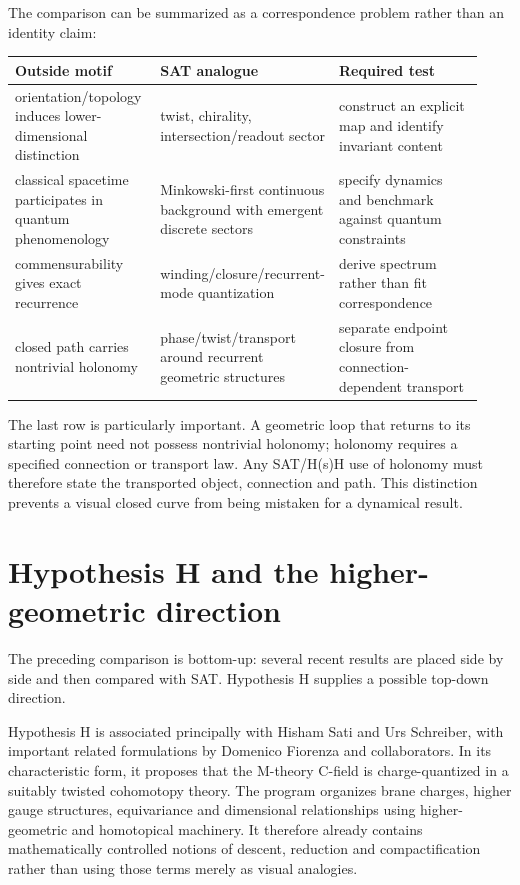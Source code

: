 \documentclass[11pt]{article}
\begin{document}
The comparison can be summarized as a correspondence problem rather than an identity claim:
\begin{center}
\begin{tabular}{p{0.31\linewidth}p{0.31\linewidth}p{0.31\linewidth}}
\toprule
Outside motif & SAT analogue & Required test \\
\midrule
orientation/topology induces lower-dimensional distinction & twist, chirality, intersection/readout sector & construct an explicit map and identify invariant content \\
classical spacetime participates in quantum phenomenology & Minkowski-first continuous background with emergent discrete sectors & specify dynamics and benchmark against quantum constraints \\
commensurability gives exact recurrence & winding/closure/recurrent-mode quantization & derive spectrum rather than fit correspondence \\
closed path carries nontrivial holonomy & phase/twist/transport around recurrent geometric structures & separate endpoint closure from connection-dependent transport \\
\bottomrule
\end{tabular}
\end{center}

The last row is particularly important. A geometric loop that returns to its starting point need not possess nontrivial holonomy; holonomy requires a specified connection or transport law. Any SAT/H(s)H use of holonomy must therefore state the transported object, connection and path. This distinction prevents a visual closed curve from being mistaken for a dynamical result.

\section{Hypothesis H and the higher-geometric direction}
The preceding comparison is bottom-up: several recent results are placed side by side and then compared with SAT. Hypothesis H supplies a possible top-down direction.

Hypothesis H is associated principally with Hisham Sati and Urs Schreiber, with important related formulations by Domenico Fiorenza and collaborators. In its characteristic form, it proposes that the M-theory C-field is charge-quantized in a suitably twisted cohomotopy theory. The program organizes brane charges, higher gauge structures, equivariance and dimensional relationships using higher-geometric and homotopical machinery. It therefore already contains mathematically controlled notions of descent, reduction and compactification rather than using those terms merely as visual analogies.
\end{document}
